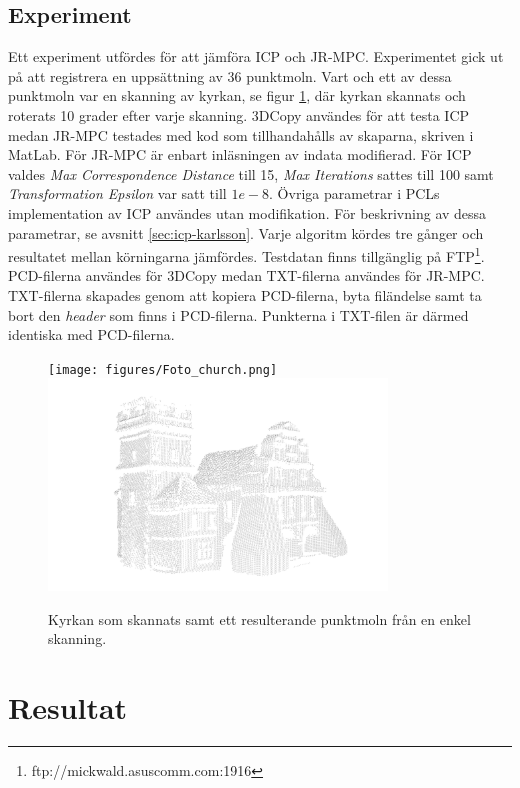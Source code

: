 \subsection{Experiment}
Ett experiment utfördes för att jämföra ICP och JR-MPC. Experimentet gick ut på att registrera en uppsättning av 36 punktmoln. Vart och ett av dessa punktmoln var en skanning av kyrkan, se figur \ref{fig:karlsson-single_scan-church}, där kyrkan skannats och roterats 10 grader efter varje skanning. 3DCopy användes för att testa ICP medan JR-MPC testades med kod som tillhandahålls av skaparna, skriven i MatLab. För JR-MPC är enbart inläsningen av indata modifierad. För ICP valdes \textit{Max Correspondence Distance} till 15, \textit{Max Iterations} sattes till 100 samt \textit{Transformation Epsilon} var satt till $ 1e-8 $. Övriga parametrar i PCLs implementation av ICP användes utan modifikation. För beskrivning av dessa parametrar, se avsnitt \ref{sec:icp-karlsson}. Varje algoritm kördes tre gånger och resultatet mellan körningarna jämfördes. Testdatan finns tillgänglig på FTP\footnote{ftp://mickwald.asuscomm.com:1916}. PCD-filerna användes för 3DCopy medan TXT-filerna användes för JR-MPC. TXT-filerna skapades genom att kopiera PCD-filerna, byta filändelse samt ta bort den \textit{header} som finns i PCD-filerna. Punkterna i TXT-filen är därmed identiska med PCD-filerna.

\begin{figure}[H]
	\centering
	\texttt{[image: figures/Foto\_church.png]}
	\includegraphics[width=90mm]{figures/icke_komplett_moln_kyrka.png}
	\caption{Kyrkan som skannats samt ett resulterande punktmoln från en enkel skanning.}
	\label{fig:karlsson-single_scan-church}
\end{figure}


\section{Resultat}
\label{sec:results-karlsson}

